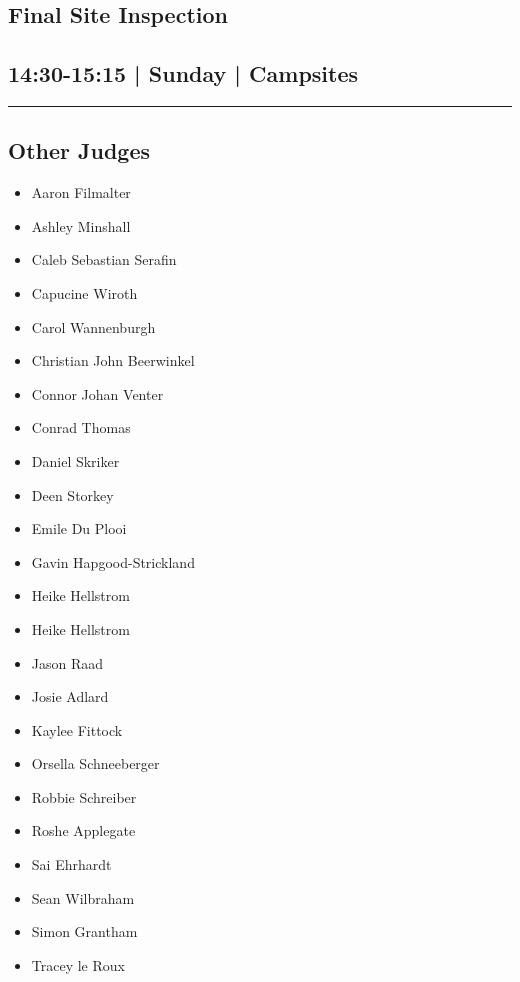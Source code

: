 \documentclass[10pt, A5]{article}
\begin{document}
        \begin{framed}
        \begin{minipage}{\textwidth}

        \setcounter{section}{86}
        \section{Final Site Inspection}
        \subsection*{14:30-15:15 | Sunday | Campsites}

        \vspace{0.25cm}
        \hrule
        \vspace{0.25cm}


        \subsection*{Other Judges}
                    

        	\begin{multicols}{2}

		\begin{itemize}
									\item Aaron Filmalter
									\item Ashley Minshall
									\item Caleb Sebastian Serafin
									\item Capucine Wiroth
									\item Carol Wannenburgh
									\item Christian John Beerwinkel
									\item Connor Johan Venter
									\item Conrad Thomas
									\item Daniel Skriker
									\item Deen Storkey
									\item Emile Du Plooi
									\item Gavin Hapgood-Strickland
									\item Heike Hellstrom
						\end{itemize}

		\vfill\null
		\columnbreak

		\begin{itemize}
									\item Heike Hellstrom
									\item Jason Raad
									\item Josie Adlard
									\item Kaylee Fittock
									\item Orsella Schneeberger
									\item Robbie Schreiber
									\item Roshe Applegate
									\item Sai Ehrhardt
									\item Sean Wilbraham
									\item Simon Grantham
									\item Tracey le Roux
						\end{itemize}


\end{multicols}
\end{minipage}
\end{framed}
\end{document}
